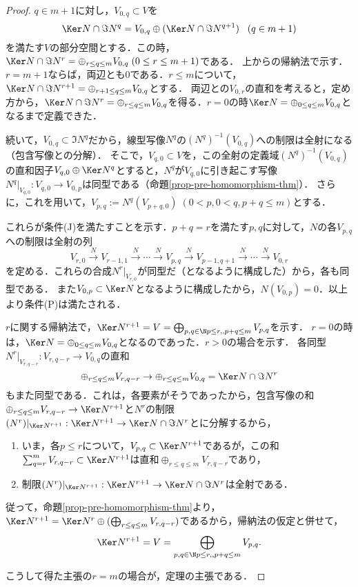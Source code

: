 \documentclass[uplatex, dvipdfmx]{jsreport}
\begin{document}
\begin{proof}
    $q\in m+1$に対し，$V_{0,q}\subset V$を
    \[ \Ker N\cap\Im N^q=V_{0,q}\oplus(\Ker N\cap\Im N^{q+1})\;\;\;(q\in m+1) \]
    を満たす$V$の部分空間とする．この時，$\Ker N\cap\Im N^r=\oplus_{r\le q\le m}V_{0,q}\;(0\le r\le m+1)$である．
    上からの帰納法で示す．$r=m+1$ならば，両辺とも$0$である．$r\le m$について，$\Ker N\cap\Im N^{r+1}=\oplus_{r+1\le q\le m}V_{0,q}$とする．
    両辺との$V_{0,r}$の直和を考えると，定め方から，$\Ker N\cap\Im N^r=\oplus_{r\le q\le m}V_{0,q}$を得る．$r=0$の時$\Ker N=\oplus_{0\le q\le m}V_{0,q}$となるまで定義できた．

    続いて，$V_{0,q}\subset\Im N^q$だから，線型写像$N^q$の$(N^q)^{-1}(V_{0,q})$への制限は全射になる（包含写像との分解）．
    そこで，$V_{q,0}\subset V$を，この全射の定義域$(N^q)^{-1}(V_{0,q})$の直和因子$V_{q,0}\oplus\Ker N^q$とすると，$N^q$が$V_{q,0}$に引き起こす写像$N^q|_{V_{q,0}}:V_{q,0}\to V_{0,p}$は同型である（命題\ref{prop-pre-homomorphism-thm}）．
    さらに，これを用いて，$V_{p,q}:=N^q(V_{p+q,0})\;(0<p,0<q,p+q\le m)$とする．

    これらが条件(J)を満たすことを示す．$p+q=r$を満たす$p,q$に対して，$N$の各$V_{p,q}$への制限は全射の列
    \[ V_{r,0}\xrightarrow{N}V_{r-1,1}\xrightarrow{N}\cdots\xrightarrow{N}V_{p,q}\xrightarrow{N}V_{p-1,q+1}\xrightarrow{N}\cdots\xrightarrow{N}V_{0,r} \]
    を定める．これらの合成$N^r|_{V_{r,0}}$が同型だ（となるように構成した）から，各も同型である．
    また$V_{0,p}\subset\Ker N$となるように構成したから，$N(V_{0,p})=0$．以上より条件(P)は満たされる．

    $r$に関する帰納法で，$\Ker N^{r+1}=V=\bigoplus_{p,q\in\N p\le r,,p+q\le m}V_{p,q}$を示す．
    $r=0$の時は，$\Ker N=\oplus_{0\le q\le m}V_{0,q}$となるのであった．$r>0$の場合を示す．
    各同型$N^r|_{V_{r,q-r}}:V_{r,q-r}\to V_{0,q}$の直和
    \[ \oplus_{r\le q\le m}V_{r,q-r}\to\oplus_{r\le q\le m}V_{0,q}=\Ker N\cap \Im N^r \]
    もまた同型である．これは，各要素がそうであったから，包含写像の和$\oplus_{r\le q\le m}V_{r,q-r}\to\Ker N^{r+1}$と$N^r$の制限$(N^r)|_{\Ker N^{r+1}}:\Ker N^{r+1}\to\Ker N\cap\Im N^r$とに分解するから，
    \begin{enumerate}
        \item いま，各$p\le r$について，$V_{p,q}\subset\Ker N^{r+1}$であるが，この和$\sum_{q=r}^m V_{r,q-r}\subset\Ker N^{r+1}$は直和$\oplus_{r\le q\le m}V_{r,q-r}$であり，
        \item 制限$(N^r)|_{\Ker N^{r+1}}:\Ker N^{r+1}\to\Ker N\cap\Im N^r$は全射である．
    \end{enumerate}
    従って，命題\ref{prop-pre-homomorphism-thm}より，$\Ker N^{r+1}=\Ker N^r\oplus(\bigoplus_{r\le q\le m}V_{r,q-r})$であるから，帰納法の仮定と併せて，
    \[ \Ker N^{r+1}=V=\bigoplus_{p,q\in\N p\le r,,p+q\le m}V_{p,q}. \]

    こうして得た主張の$r=m$の場合が，定理の主張である．
\end{proof}
\end{document}
